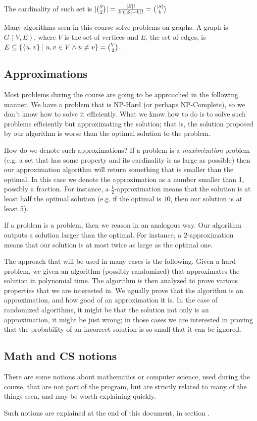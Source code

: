     The cardinality of such set is $\vert \binom{S}{2} \vert = \frac{\vert S \vert!}{k! (\vert S \vert - k)!} = \binom{\vert S \vert}{k}$


    Many algorithms seen in this course solve problems on graphs.
    A graph is $G(V,E)$, where $V$ is the set of vertices and $E$, the set of edges, is $E \subseteq \{ \{ u,v \} \; \vert \; u,v \in V \wedge u \neq v \} = \binom{V}{2} $.


\subsection{Approximations}
    Most problems during the course are going to be approached in the following manner.
    We have a problem that is NP-Hard (or perhaps NP-Complete), so we don't know how to solve it efficiently.
    What we know how to do is to solve such problems efficiently but approximating the solution; that is, the solution proposed by our algorithm is worse than the optimal solution to the problem.

    How do we denote such approximations?
    If a problem is a \textit{maximization} problem (e.g. a set that has some property and its cardinality is as large as possible) then our approximation algorithm will return something that is smaller than the optimal.
    In this case we denote the approximation as a number smaller than 1, possibly a fraction. For instance, a $\frac{1}{2}$-approximation means that the solution is at least half the optimal solution (e.g. if the optimal is $10$, then our solution is at least 5).

    If a problem is a  problem, then we reason in an analogous way. Our algorithm outputs a solution larger than the optimal.
    For instance, a $2$-approximation means that our solution is at most twice as large as the optimal one.

    The approach that will be used in many cases is the following. Given a hard problem, we given an algorithm (possibly randomized) that approximates the solution in polynomial time.
    The algorithm is then analyzed to prove various properties that we are interested in. We ugually prove that the algorithm is an approximation, and how good of an approximation it is.
    In the case of randomized algorithms, it might be that the solution not only is an approximation, it might be just wrong; in those cases we are interested in proving that the probability of an incorrect solution is so small that it can be ignored.


\subsection{Math and CS notions}
    There are some notions about mathematics or computer science, used during the course, that are not part of the program, but are strictly related to many of the things seen, and may be worth explaining quickly.
    
    Such notions are explained at the end of this document, in section .